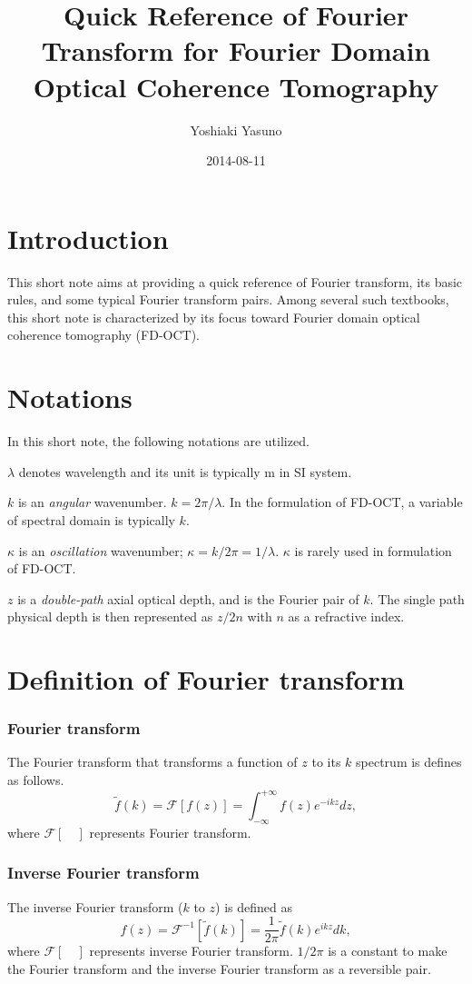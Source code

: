 \documentclass{article}[10pt,a4paper]
\title{Quick Reference of Fourier Transform for Fourier Domain Optical
Coherence Tomography}
\author{Yoshiaki Yasuno}
\date{2014-08-11}
\newcommand{\ft}[1]{\mathcal{F}\left[{#1}\right]\xspace}
\newcommand{\ift}[1]{\mathcal{F}^{-1}\left[{#1}\right]\xspace}
\newcommand{\sexp}[1]{e^{#1}\xspace}
\newcommand{\intinfty}{\int^{+\infty}_{-\infty}\xspace}
\begin{document}
\maketitle
\tableofcontents

\section{Introduction}
This short note aims at providing a quick reference of Fourier transform, its basic rules, and some typical Fourier transform pairs.
Among several such textbooks, this short note is characterized by its focus toward Fourier domain optical coherence tomography (FD-OCT).

\section{Notations}
In this short note, the following notations are utilized.

$\lambda$ denotes wavelength and its unit is typically m in SI system.

$k$ is an {\em angular} wavenumber. $k = 2\pi/\lambda$.
In the formulation of FD-OCT, a variable of spectral domain is typically
$k$.

$\kappa$ is an {\em oscillation} wavenumber; $\kappa = k/2\pi =
1/\lambda$. $\kappa$ is rarely used in formulation of FD-OCT.

$z$ is a {\em double-path} axial optical depth, and is the Fourier pair
of $k$.
The single path physical depth is then represented as $z/2n$ with $n$ as a refractive index.

\section{Definition of Fourier transform}

\subsubsection*{Fourier transform}
\noindent
The Fourier transform that transforms a function of $z$ to its $k$
spectrum is defines as follows.
\begin{equation}
 \tilde{f}(k) = \ft{f(z)} = \intinfty f(z) \sexp{-ikz} dz,
\end{equation}
where $\ft{\quad}$ represents Fourier transform.

\subsubsection*{Inverse Fourier transform}
The inverse Fourier transform ($k$ to $z$) is defined as
\begin{equation}
 f(z) = \ift{\tilde{f}(k)} = \frac{1}{2 \pi} \tilde{f}(k) \sexp{ikz} dk,
\end{equation}
where $\ft{\quad}$ represents inverse Fourier transform.
$1/2\pi$ is a constant to make the Fourier transform and the inverse
Fourier transform as a reversible pair.
\end{document}
